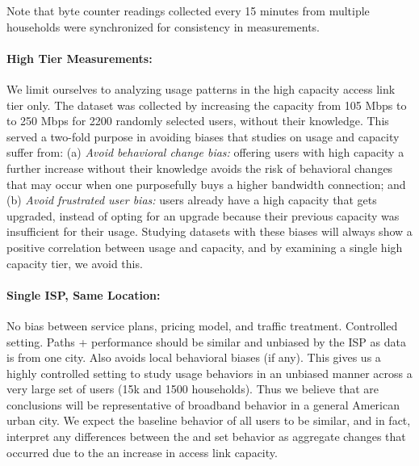 Note that byte counter readings collected every 15 minutes from multiple 
households were synchronized for consistency in measurements.

\paragraph{High Tier Measurements:} We limit ourselves to analyzing usage 
patterns in the high capacity access link tier only. The \test dataset was 
collected by increasing the capacity from 105 Mbps to to 250 Mbps for 2200 
randomly selected users, without their knowledge. This served a two-fold purpose 
in avoiding biases that studies on usage and capacity suffer from: (a) 
\emph{Avoid behavioral change bias:} offering users with high capacity a further 
increase without their knowledge avoids the risk of behavioral changes that may 
occur when one purposefully buys a higher bandwidth connection; and (b) 
\emph{Avoid frustrated user bias:} users already have a high capacity that gets 
upgraded, instead of opting for an upgrade because their previous capacity was 
insufficient for their usage. Studying datasets with these biases will always 
show a positive correlation between usage and capacity, and by examining a 
single high capacity tier, we avoid this.


\paragraph{Single ISP, Same Location:} No bias between service plans, pricing 
model, and traffic treatment. Controlled setting. Paths + performance should be 
similar and unbiased by the ISP as data is from one city. Also avoids local 
behavioral biases (if any).
This gives us a highly controlled setting to study usage behaviors in an 
unbiased manner across a very large set of users (15k \control and 1500 \test 
households). Thus we believe that are conclusions will be representative of 
broadband behavior in a general American urban city. We expect the baseline 
behavior of all users to be similar, and in fact, interpret any differences 
between the \control and \test set behavior as aggregate changes that occurred 
due to the an increase in access link capacity.

